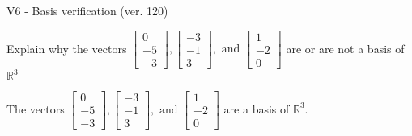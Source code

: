 \begin{exercise}
  \begin{exerciseTitle}V6 - Basis verification (ver. 120)\end{exerciseTitle}
  \begin{exerciseStatement}
    Explain why the vectors \(\left[\begin{array}{r}
0 \\
-5 \\
-3
\end{array}\right] , \left[\begin{array}{r}
-3 \\
-1 \\
3
\end{array}\right] , \text{ and } \left[\begin{array}{r}
1 \\
-2 \\
0
\end{array}\right]\) are or are not a basis of \(\mathbb{R}^3\)	


  \end{exerciseStatement}
  \begin{exerciseAnswer}
   The vectors \(\left[\begin{array}{r}
0 \\
-5 \\
-3
\end{array}\right] , \left[\begin{array}{r}
-3 \\
-1 \\
3
\end{array}\right] , \text{ and } \left[\begin{array}{r}
1 \\
-2 \\
0
\end{array}\right]\) 
  	 are  a basis of \(\mathbb{R}^3\).
  


  \end{exerciseAnswer}
\end{exercise}